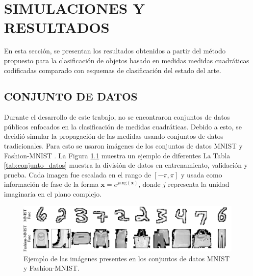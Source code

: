 
\chapter{SIMULACIONES Y RESULTADOS}

En esta sección, se presentan los resultados obtenidos a partir del método propuesto para la clasificación de objetos basado en medidas medidas cuadráticas codificadas comparado con esquemas de clasificación del estado del arte.

\section{CONJUNTO DE DATOS}

Durante el desarrollo de este trabajo, no se encontraron conjuntos de datos públicos enfocados en la clasificación de medidas cuadráticas. Debido a esto, se decidió simular la propagación de las medidas usando conjuntos de datos tradicionales. Para esto se usaron imágenes de los conjuntos de datos MNIST  y Fashion-MNIST . La Figura \ref{fig:conjunto_datos} muestra un ejemplo de diferentes La Tabla \ref{tab:conjunto_datos} muestra la división de datos en entrenamiento, validación y prueba. Cada imagen fue escalada en el rango de $[-\pi, \pi]$ y usada como información de fase de la forma $\mathbf{x}=e^{j\mathrm{ang}(\mathbf{x})}$, donde $j$ representa la unidad imaginaria en el plano complejo.

\begin{figure}[!h]
    \centering
    \includegraphics[width=\linewidth]{images/resultados/datasets.pdf}
    \caption{Ejemplo de las imágenes presentes en los conjuntos de datos MNIST y Fashion-MNIST.}
    \label{fig:conjunto_datos}
\end{figure}


